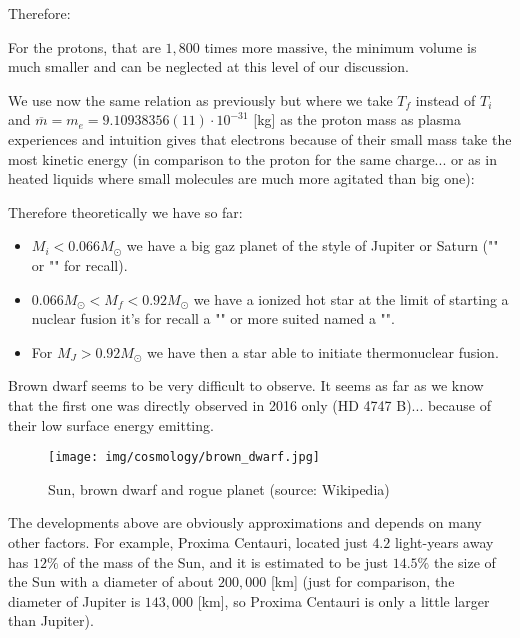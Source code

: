 	Therefore:
	
	For the protons, that are $1,800$ times more massive, the minimum volume is much smaller and can be neglected at this level of our discussion.
	
	We use now the same relation as previously but where we take $T_f$ instead of $T_i$ and $\overline{m}=m_e=9.10938356(11)\cdot 10^{-31}$ [kg] as the proton mass as plasma experiences and intuition gives that electrons because of their small mass take the most kinetic energy (in comparison to the proton for the same charge... or as in heated liquids where small molecules are much more agitated than big one):
	
	Therefore theoretically we have so far:
	\begin{itemize}
		\item $M_i<0.066M_\odot$ we have a big gaz planet of the style of Jupiter or Saturn ("" or "" for recall).

		\item $0.066M_\odot<M_f<0.92M_\odot$ we have a ionized hot star at the limit of starting a nuclear fusion it's for recall a "" or more suited named a "".

		\item For $M_J>0.92M_\odot$ we have then a star able to initiate thermonuclear fusion.
	\end{itemize}
	Brown dwarf seems to be very difficult to observe. It seems as far as we know that the first one was directly observed in 2016 only (HD 4747 B)... because of their low surface energy emitting.
	\begin{figure}[H]
		\begin{center}
		\texttt{[image: img/cosmology/brown\_dwarf.jpg]}
		\end{center}	
		\caption[Sun, brown dwarf and rogue planet]{Sun, brown dwarf and rogue planet (source: Wikipedia)}
	\end{figure}
	The developments above are obviously approximations and depends on many other factors. For example, Proxima Centauri, located just $4.2$ light-years away has $12\%$ of the mass of the Sun, and it is estimated to be just $14.5\%$ the size of the Sun with a diameter of  about $200,000$ [km] (just for comparison, the diameter of Jupiter is $143,000$ [km], so Proxima Centauri is only a little larger than Jupiter).\\

